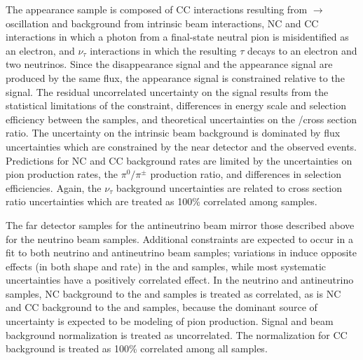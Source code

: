 The \nue appearance sample is composed of \nue CC interactions resulting from \numu$\rightarrow$\nue oscillation
and background from intrinsic beam \nue interactions, NC and
\numu CC interactions in which a photon from a final-state neutral pion is
misidentified as an electron, and $\nu_{\tau}$ interactions in which the resulting $\tau$
decays to an electron and
two neutrinos. Since the
\numu disappearance signal and the \nue appearance signal are produced by the same flux,
the \nue appearance signal is constrained relative to the \numu
signal. The residual uncorrelated uncertainty on the \nue signal results from the statistical
limitations of the \numu constraint, differences in energy scale and selection efficiency between the samples,
and theoretical uncertainties on the \nue/\numu cross section ratio.
The uncertainty on the intrinsic
beam \nue background is dominated by flux uncertainties which are constrained by the near detector and the
observed \numu events.
Predictions for NC and \numu CC background rates are limited by the uncertainties on pion
production rates,
the $\pi^{0}/\pi^{\pm}$ production ratio, and
differences in selection efficiencies.
Again, the $\nu_{\tau}$ background uncertainties are related to cross section ratio uncertainties
which are treated as 100\% correlated among samples.

The far detector samples for the antineutrino beam mirror those described above for the neutrino beam samples.
Additional constraints are expected to occur in a fit to both neutrino and antineutrino beam samples;
variations in \deltacp induce opposite effects (in both shape and rate) in the \nue and \anue samples,
while most systematic uncertainties have a positively correlated effect.
In the neutrino and antineutrino samples,
NC background to the \numu and \anumu samples is treated as correlated,
as is NC and \numu CC background to the \nue and \anue samples, because the dominant source
of uncertainty is expected to be modeling of pion production.
Signal and beam \nue background normalization is treated as uncorrelated.
The normalization for \nutau CC background is treated as 100\% correlated among all samples.

